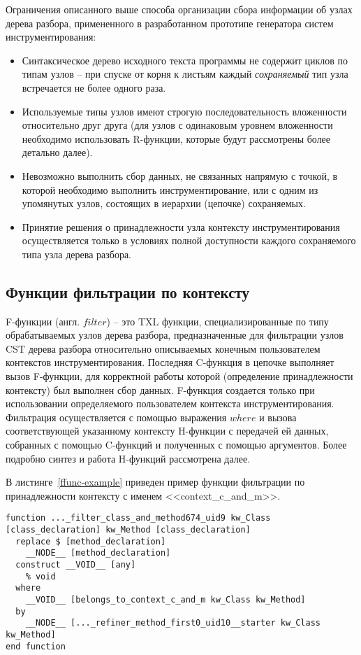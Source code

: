 Ограничения описанного выше способа организации сбора информации об узлах дерева разбора, примененного в разработанном прототипе генератора систем инструментирования:
\begin{itemize}[noitemsep]
  \item Синтаксическое дерево исходного текста программы не содержит циклов по типам узлов -- при спуске от корня к листьям каждый \textit{сохраняемый} тип узла встречается не более одного раза.
  \item Используемые типы узлов имеют строгую последовательность вложенности относительно друг друга (для узлов с одинаковым уровнем вложенности необходимо использовать R-функции, которые будут рассмотрены более детально далее).
  \item Невозможно выполнить сбор данных, не связанных напрямую с точкой, в которой необходимо выполнить инструментирование, или с одним из упомянутых узлов, состоящих в иерархии (цепочке) сохраняемых.
  \item Принятие решения о принадлежности узла контексту инструментирования осуществляется только в условиях полной доступности каждого сохраняемого типа узла дерева разбора.
\end{itemize}

\subsection{Функции фильтрации по контексту}

F-функции (англ. $filter$) -- это TXL функции, специализированные по типу обрабатываемых узлов дерева разбора, предназначенные для фильтрации узлов CST дерева разбора относительно описываемых конечным пользователем контекстов инструментирования.
Последняя C-функция в цепочке выполняет вызов F-функции, для корректной работы которой (определение принадлежности контексту) был выполнен сбор данных.
F-функция создается только при использовании определяемого пользователем контекста инструментирования.
Фильтрация осуществляется с помощью выражения $where$ и вызова соответствующей указанному контексту H-функции с передачей ей данных, собранных с помощью C-функций и полученных с помощью аргументов.
Более подробно синтез и работа H-функций рассмотрена далее.

В листинге~\ref{ffunc-example} приведен пример функции фильтрации по принадлежности контексту с именем <<context\_c\_and\_m>>.

\begin{lstlisting}[language=TXL, label={ffunc-example}, caption={Пример синтезированной F-функции.}]
function ..._filter_class_and_method674_uid9 kw_Class [class_declaration] kw_Method [class_declaration]
  replace $ [method_declaration]
    __NODE__ [method_declaration]
  construct __VOID__ [any]
    % void
  where
    __VOID__ [belongs_to_context_c_and_m kw_Class kw_Method]
  by
    __NODE__ [..._refiner_method_first0_uid10__starter kw_Class kw_Method]
end function
\end{lstlisting}

